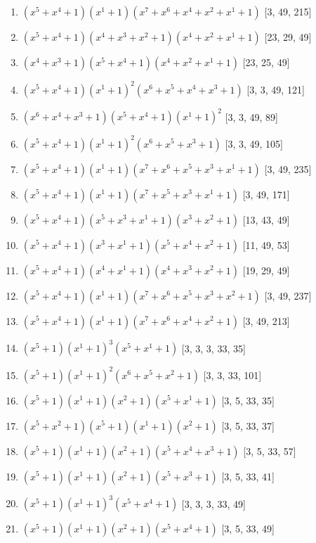 \documentclass[10pt,twocolumn]{article}
\begin{document}
\begin{enumerate}
\item $(x^{5} + x^{4} + 1)(x^{1} + 1)(x^{7} + x^{6} + x^{4} + x^{2} + x^{1} + 1)$  [3, 49, 215]
\item $(x^{5} + x^{4} + 1)(x^{4} + x^{3} + x^{2} + 1)(x^{4} + x^{2} + x^{1} + 1)$  [23, 29, 49]
\item $(x^{4} + x^{3} + 1)(x^{5} + x^{4} + 1)(x^{4} + x^{2} + x^{1} + 1)$  [23, 25, 49]
\item $(x^{5} + x^{4} + 1)(x^{1} + 1)^{2}(x^{6} + x^{5} + x^{4} + x^{3} + 1)$  [3, 3, 49, 121]
\item $(x^{6} + x^{4} + x^{3} + 1)(x^{5} + x^{4} + 1)(x^{1} + 1)^{2}$  [3, 3, 49, 89]
\item $(x^{5} + x^{4} + 1)(x^{1} + 1)^{2}(x^{6} + x^{5} + x^{3} + 1)$  [3, 3, 49, 105]
\item $(x^{5} + x^{4} + 1)(x^{1} + 1)(x^{7} + x^{6} + x^{5} + x^{3} + x^{1} + 1)$  [3, 49, 235]
\item $(x^{5} + x^{4} + 1)(x^{1} + 1)(x^{7} + x^{5} + x^{3} + x^{1} + 1)$  [3, 49, 171]
\item $(x^{5} + x^{4} + 1)(x^{5} + x^{3} + x^{1} + 1)(x^{3} + x^{2} + 1)$  [13, 43, 49]
\item $(x^{5} + x^{4} + 1)(x^{3} + x^{1} + 1)(x^{5} + x^{4} + x^{2} + 1)$  [11, 49, 53]
\item $(x^{5} + x^{4} + 1)(x^{4} + x^{1} + 1)(x^{4} + x^{3} + x^{2} + 1)$  [19, 29, 49]
\item $(x^{5} + x^{4} + 1)(x^{1} + 1)(x^{7} + x^{6} + x^{5} + x^{3} + x^{2} + 1)$  [3, 49, 237]
\item $(x^{5} + x^{4} + 1)(x^{1} + 1)(x^{7} + x^{6} + x^{4} + x^{2} + 1)$  [3, 49, 213]
\item $(x^{5} + 1)(x^{1} + 1)^{3}(x^{5} + x^{1} + 1)$  [3, 3, 3, 33, 35]
\item $(x^{5} + 1)(x^{1} + 1)^{2}(x^{6} + x^{5} + x^{2} + 1)$  [3, 3, 33, 101]
\item $(x^{5} + 1)(x^{1} + 1)(x^{2} + 1)(x^{5} + x^{1} + 1)$  [3, 5, 33, 35]
\item $(x^{5} + x^{2} + 1)(x^{5} + 1)(x^{1} + 1)(x^{2} + 1)$  [3, 5, 33, 37]
\item $(x^{5} + 1)(x^{1} + 1)(x^{2} + 1)(x^{5} + x^{4} + x^{3} + 1)$  [3, 5, 33, 57]
\item $(x^{5} + 1)(x^{1} + 1)(x^{2} + 1)(x^{5} + x^{3} + 1)$  [3, 5, 33, 41]
\item $(x^{5} + 1)(x^{1} + 1)^{3}(x^{5} + x^{4} + 1)$  [3, 3, 3, 33, 49]
\item $(x^{5} + 1)(x^{1} + 1)(x^{2} + 1)(x^{5} + x^{4} + 1)$  [3, 5, 33, 49]

\end{enumerate}
\end{document}
